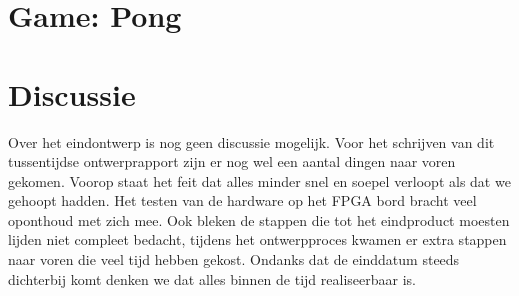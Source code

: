 \documentclass[oneside,dutch]{tudelft-report}
\begin{document}
\newpage

\chapter{Game: Pong}

\chapter{Discussie}
Over het eindontwerp is nog geen discussie mogelijk. Voor het schrijven van dit tussentijdse ontwerprapport zijn er nog wel een aantal dingen naar voren gekomen. Voorop staat het feit dat alles minder snel en soepel verloopt als dat we gehoopt hadden. Het testen van de hardware op het FPGA bord bracht veel oponthoud met zich mee. Ook bleken de stappen die tot het eindproduct moesten lijden niet compleet bedacht, tijdens het ontwerpproces kwamen er extra stappen naar voren die veel tijd hebben gekost. Ondanks dat de einddatum steeds dichterbij komt denken we dat alles binnen de tijd realiseerbaar is.
\end{document}
